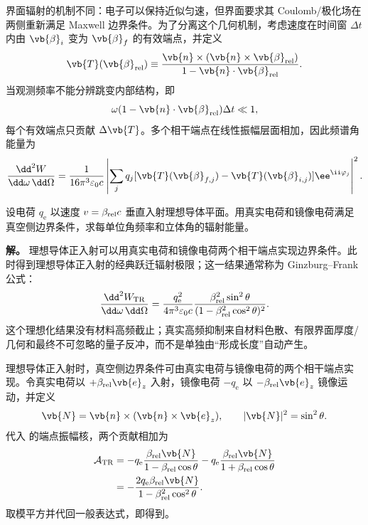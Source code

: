 界面辐射的机制不同：电子可以保持近似匀速，但界面要求其 Coulomb/极化场在两侧重新满足 Maxwell 边界条件。为了分离这个几何机制，考虑速度在时间窗 $\Delta t$ 内由 $\vb{\beta}_i$ 变为 $\vb{\beta}_f$ 的有效端点，并定义
\begin{equation*}
\vb{T}(\vb{\beta}_{\rm rel})
\equiv
\frac{\vb{n}\times(\vb{n}\times\vb{\beta}_{\rm rel})}
{1-\vb{n}\cdot\vb{\beta}_{\rm rel}}.
\end{equation*}
当观测频率不能分辨跳变内部结构，即
\begin{equation*}
\omega(1-\vb{n}\cdot\vb{\beta}_{\rm rel})\Delta t\ll1,
\end{equation*}
每个有效端点只贡献 $\Delta\vb{T}$。多个相干端点在线性振幅层面相加，因此频谱角能量为
\begin{equation}
{
\frac{\dd^2 W}{\dd\omega\,\dd\Omega}
=\frac{1}{16\pi^3\varepsilon_0c}
\left|
\sum_jq_j
[\vb{T}(\vb{\beta}_{f,j})-\vb{T}(\vb{\beta}_{i,j})]
\ee^{\ii\varphi_j}
\right|^2.}
\label{eq:abrupt_velocity_change_spectrum}
\end{equation}
\begin{exbox}[理想导体渡越辐射]
设电荷 $q_{\mathrm e}$ 以速度 $v=\beta_{\rm rel}c$ 垂直入射理想导体平面。用真实电荷和镜像电荷满足真空侧边界条件，求每单位角频率和立体角的辐射能量。

\textbf{解。} 理想导体正入射可以用真实电荷和镜像电荷两个相干端点实现边界条件。此时得到理想导体正入射的经典跃迁辐射极限；这一结果通常称为 Ginzburg--Frank 公式：
\begin{equation}
{
\frac{\dd^2 W_{\rm TR}}{\dd\omega\,\dd\Omega}
=\frac{q_{\mathrm e}^2}{4\pi^3\varepsilon_0c}
\frac{\beta_{\rm rel}^2\sin^2\theta}
{(1-\beta_{\rm rel}^2\cos^2\theta)^2}.}
\label{eq:ginzburg_frank_perfect_conductor}
\end{equation}
这个理想化结果没有材料高频截止；真实高频抑制来自材料色散、有限界面厚度/几何和最终不可忽略的量子反冲，而不是单独由“形成长度”自动产生。

\medskip

理想导体正入射时，真空侧边界条件可由真实电荷与镜像电荷的两个相干端点实现。令真实电荷以 $+\beta_{\rm rel}\vb{e}_z$ 入射，镜像电荷 $-q_{\mathrm e}$ 以 $-\beta_{\rm rel}\vb{e}_z$ 镜像运动，并定义
\begin{equation*}
\vb{N}=\vb{n}\times(\vb{n}\times\vb{e}_z),
\qquad |\vb{N}|^2=\sin^2\theta.
\end{equation*}
代入 的端点振幅核，两个贡献相加为
\begin{align*}
\mathcal A_{\rm TR}
&=-q_{\mathrm e}\frac{\beta_{\rm rel}\vb{N}}{1-\beta_{\rm rel}\cos\theta}
-q_{\mathrm e}\frac{\beta_{\rm rel}\vb{N}}{1+\beta_{\rm rel}\cos\theta}\\
&=-\frac{2q_{\mathrm e}\beta_{\rm rel}\vb{N}}{1-\beta_{\rm rel}^2\cos^2\theta}.
\end{align*}
取模平方并代回一般表达式，即得到。
\end{exbox}


